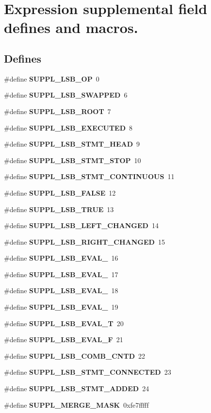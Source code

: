 \section{Expression supplemental field defines and macros.}
\label{group__expr__suppl}
\subsection*{Defines}
\begin{CompactItemize}
\item 
\#define {\bf SUPPL\_\-LSB\_\-OP}\ 0
\item 
\#define {\bf SUPPL\_\-LSB\_\-SWAPPED}\ 6
\item 
\#define {\bf SUPPL\_\-LSB\_\-ROOT}\ 7
\item 
\#define {\bf SUPPL\_\-LSB\_\-EXECUTED}\ 8
\item 
\#define {\bf SUPPL\_\-LSB\_\-STMT\_\-HEAD}\ 9
\item 
\#define {\bf SUPPL\_\-LSB\_\-STMT\_\-STOP}\ 10
\item 
\#define {\bf SUPPL\_\-LSB\_\-STMT\_\-CONTINUOUS}\ 11
\item 
\#define {\bf SUPPL\_\-LSB\_\-FALSE}\ 12
\item 
\#define {\bf SUPPL\_\-LSB\_\-TRUE}\ 13
\item 
\#define {\bf SUPPL\_\-LSB\_\-LEFT\_\-CHANGED}\ 14
\item 
\#define {\bf SUPPL\_\-LSB\_\-RIGHT\_\-CHANGED}\ 15
\item 
\#define {\bf SUPPL\_\-LSB\_\-EVAL\_}\ 16
\item 
\#define {\bf SUPPL\_\-LSB\_\-EVAL\_}\ 17
\item 
\#define {\bf SUPPL\_\-LSB\_\-EVAL\_}\ 18
\item 
\#define {\bf SUPPL\_\-LSB\_\-EVAL\_}\ 19
\item 
\#define {\bf SUPPL\_\-LSB\_\-EVAL\_\-T}\ 20
\item 
\#define {\bf SUPPL\_\-LSB\_\-EVAL\_\-F}\ 21
\item 
\#define {\bf SUPPL\_\-LSB\_\-COMB\_\-CNTD}\ 22
\item 
\#define {\bf SUPPL\_\-LSB\_\-STMT\_\-CONNECTED}\ 23
\item 
\#define {\bf SUPPL\_\-LSB\_\-STMT\_\-ADDED}\ 24
\item 
\#define {\bf SUPPL\_\-MERGE\_\-MASK}\ 0xfe7fffff
\item 

\end{CompactItemize}
